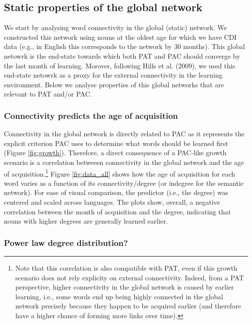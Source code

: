 \documentclass[10pt, letterpaper]{article}
\begin{document}
\subsection{Static properties of the global
network}\label{static-properties-of-the-global-network}

We start by analysing word connectivity in the global (static) network.
We constructed this network using nouns at the oldest age for which we
have CDI data (e.g., in English this corresponds to the network by 30
months). This global netowrk is the end-state towards which both PAT and
PAC should converge by the last month of learning. Morover, following
Hills et al. (2009), we used this end-state netowrk as a proxy for the
external connectivity in the learning environment. Below we analyse
properties of this global networks that are relevant to PAT and/or PAC.

\subsubsection{Connectivity predicts the age of
acquisition}\label{connectivity-predicts-the-age-of-acquisition}

Connectivity in the global network is directly related to PAC as it
represents the explicit criterion PAC uses to determine what words
should be learned first (Figure \ref{fig:growth}). Therefore, a direct
consequence of a PAC-like growth scenario is a correlation betweeen
connectivity in the global network and the age of
acquisition.\footnote{Note that this correlation is also compatible with PAT, even if this growth scenario does not rely explicity on external connectivity. Indeed, from a PAT perspective, higher connectivity in the global network is caused by earlier learning, i.e., some words end up being highly connected in the global network precisely because they happen to be acquired earlier (and therefore have a higher chance of forming more links over time).}
Figure \ref{fig:data_all} shows how the age of acquisition for each word
varies as a function of its connectivity/degree (or indegree for the
semantic network). For ease of visual comparison, the predictor (i.e.,
the degree) was centered and scaled across languages. The plots show,
overall, a negative correlation between the month of acquisition and the
degree, indicating that nouns with higher degrees are generally learned
earlier.

\subsubsection{Power law degree
distribution?}\label{power-law-degree-distribution}
\end{document}

